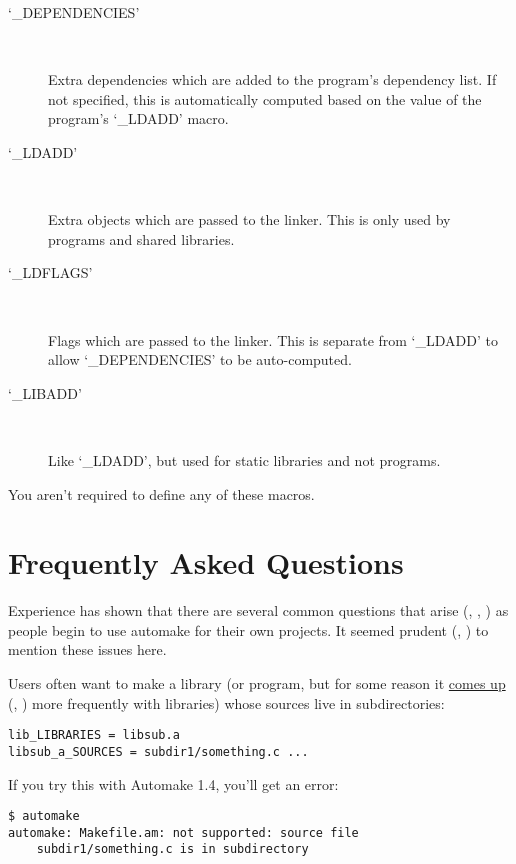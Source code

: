 \begin{description}
\item[`\_{}DEPENDENCIES']
\ %

Extra dependencies which are added to the program's dependency list. If not 
specified, this is automatically computed based on the value of the 
program's `\_{}LDADD' macro. 

\item[`\_{}LDADD']
\ %

Extra objects which are passed to the linker. This is only used by programs
and shared libraries. 

\item[`\_{}LDFLAGS']
\ %

Flags which are passed to the linker. This is separate from `\_{}LDADD' to 
allow `\_{}DEPENDENCIES' to be auto-computed. 

\item[`\_{}LIBADD']
\ %

Like `\_{}LDADD', but used for static libraries and not programs. 
\end{description}

You aren't required to define any of these macros. 

\section{Frequently Asked Questions}


Experience has shown that there are several common questions that 
arise ({\MbQ{}}, {\MaQ{}}, {\MbQ{}}) as people begin to use automake for their 
own projects. It seemed prudent ({\MaQ{}}, {\MaQ{}}) to mention these issues here. 


Users often want to make a library (or program, but for some reason it 
\underline{comes up} ({\McQ{}}, {\McQ{}}) more frequently with libraries) whose 
sources live in subdirectories: 

\begin{Verbatim}[frame=single]
lib_LIBRARIES = libsub.a
libsub_a_SOURCES = subdir1/something.c ...
\end{Verbatim}

If you try this with Automake 1.4, you'll get an error: 

\begin{Verbatim}[frame=single]
$ automake
automake: Makefile.am: not supported: source file 
    subdir1/something.c is in subdirectory
\end{Verbatim}


